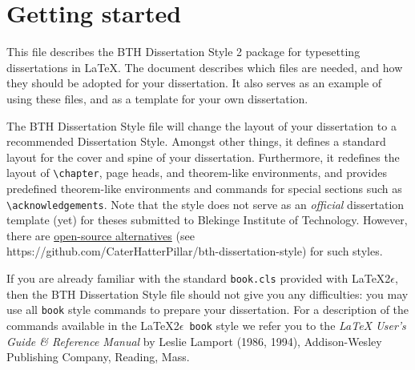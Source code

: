 
\chapter{Getting started}
This file describes the BTH Dissertation Style 2 package for
typesetting dissertations in \LaTeX .
The document describes which files are needed, and how they should be adopted
for your dissertation.
It also serves as an example of using these files, and as a template
for your own dissertation.

The BTH Dissertation Style file will change the
layout of your dissertation to a recommended Dissertation Style.
Amongst other things, it defines a standard layout for the cover and spine of your dissertation.
Furthermore, it redefines the layout of \verb|\chapter|, page heads, and theorem-like environments, and provides predefined theorem-like environments and commands for special sections such as \verb|\acknowledgements|.
Note that the style does not serve as an \textit{official} dissertation template (yet) for theses submitted to Blekinge Institute of Technology.
However, there are \href{https://github.com/CaterHatterPillar/bth-dissertation-style}{open-source alternatives} (see https://github.com/CaterHatterPillar/bth-dissertation-style) for such styles.

If you are already familiar with the standard {\tt book.cls} provided with
\LaTeX 2$\epsilon$, then the BTH Dissertation Style file should not give you
any difficulties: you may use all {\tt book} style commands to prepare 
your dissertation.
For a description of the commands available in the \LaTeX 2$\epsilon$\ 
{\tt book} style we refer you to the {\em \LaTeX{} User's Guide \& Reference
Manual\/} by Leslie Lamport (1986, 1994), Addison-Wesley Publishing
Company, Reading, Mass.

